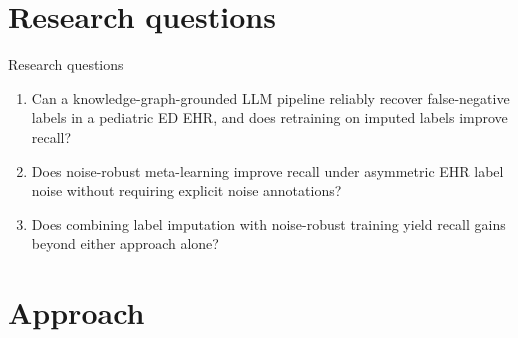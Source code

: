 \documentclass[aspectratio=169]{beamer}
\begin{document}
\section{Research questions}

\begin{frame}{Research questions}
  \begin{enumerate}
    \setlength{\itemsep}{1em}
    \item Can a knowledge-graph-grounded LLM pipeline reliably recover
          false-negative labels in a pediatric ED EHR, and does
          retraining on imputed labels improve recall?

    \item Does noise-robust meta-learning improve recall under
          asymmetric EHR label noise without requiring explicit
          noise annotations?

    \item Does combining label imputation with noise-robust training
          yield recall gains beyond either approach alone?
  \end{enumerate}
\end{frame}

\section{Approach}
\end{document}

